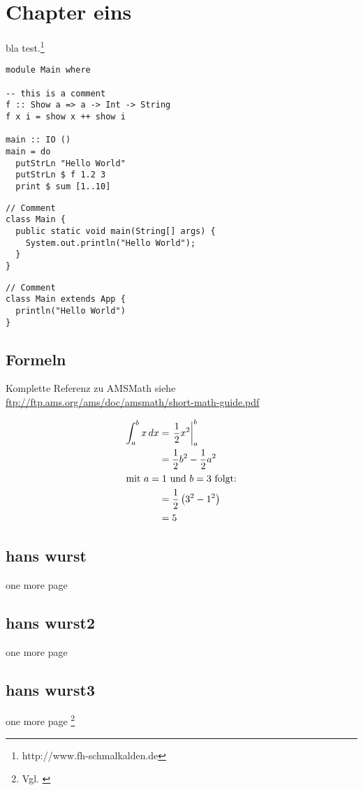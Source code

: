 \chapter{Chapter eins}
bla test.\footnote{http://www.fh-schmalkalden.de}

\begin{lstlisting}[label=listinghaskell,caption=This is Haskell]
module Main where

-- this is a comment
f :: Show a => a -> Int -> String
f x i = show x ++ show i

main :: IO ()
main = do
  putStrLn "Hello World"
  putStrLn $ f 1.2 3
  print $ sum [1..10]
\end{lstlisting}

\begin{lstlisting}[label=listingjava,caption=This is Java]
// Comment
class Main {
  public static void main(String[] args) {
    System.out.println("Hello World");
  }
}
\end{lstlisting}

\begin{lstlisting}[label=listingscala,caption=This is Scala]
// Comment
class Main extends App {
  println("Hello World")
}
\end{lstlisting}

\section{Formeln}

Komplette Referenz zu AMSMath siehe \\
\url{ftp://ftp.ams.org/ams/doc/amsmath/short-math-guide.pdf}

\begin{align}
 \int_{a}^{b} x\,dx
 & = \left.\frac{1}{2} x^2\right\vert_{a}^{b}\\
 & = \frac{1}{2} b^2 - \frac{1}{2} a^2 \\
 \intertext{mit $a=1$ und $b=3$ folgt:}
 \notag
 & = \frac{1}{2} \left(3^2 - 1^2\right)\\
 & = 5
\end{align}

\section{hans wurst}
one more page

\section{hans wurst2}
one more page

\section{hans wurst3}
one more page \footnote{Vgl. \cite{braun:scala}}

